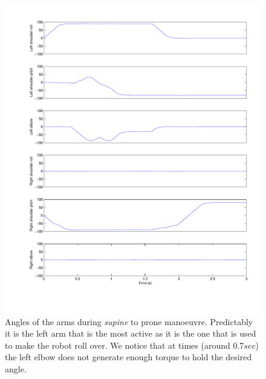 \begin{figure}[htp]
\center
    \includegraphics[width = \textwidth]{figures/sup2proneArms}
    \caption[Angles of the arms during \emph{supine} to prone manoeuvre]{Angles of the arms during \emph{supine} to prone manoeuvre. Predictably it is the left arm that is the most active as it is the one that is used to make the robot roll over. We notice that at times (around $0.7sec$) the left elbow does not generate enough torque to hold the desired angle.}
    \label{fig:sup2proneArms}
\end{figure}

